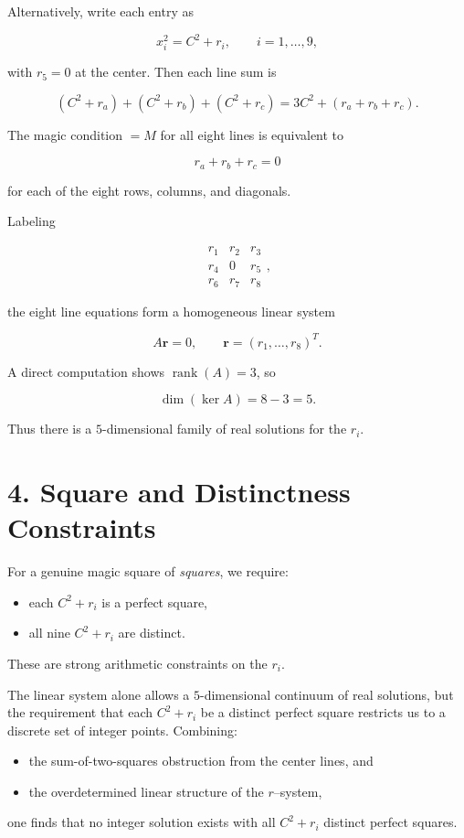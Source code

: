\documentclass[12pt]{article}
\begin{document}
Alternatively, write each entry as


\[
x_i^2 = C^2 + r_i,\qquad i=1,\dots,9,
\]


with $r_5 = 0$ at the center.  Then each line sum is


\[
(C^2+r_a)+(C^2+r_b)+(C^2+r_c)
= 3C^2 + (r_a+r_b+r_c).
\]


The magic condition $=M$ for all eight lines is equivalent to


\[
r_a + r_b + r_c = 0
\]


for each of the eight rows, columns, and diagonals.

Labeling


\[
\begin{matrix}
r_1 & r_2 & r_3 \\
r_4 & 0   & r_5 \\
r_6 & r_7 & r_8
\end{matrix},
\]


the eight line equations form a homogeneous linear system


\[
A\mathbf{r} = 0,\qquad \mathbf{r}=(r_1,\dots,r_8)^T.
\]


A direct computation shows $\operatorname{rank}(A)=3$, so


\[
\dim(\ker A)=8-3=5.
\]


Thus there is a $5$-dimensional family of real solutions for the $r_i$.

\section*{4. Square and Distinctness Constraints}

For a genuine magic square of \emph{squares}, we require:
\begin{itemize}
    \item each $C^2 + r_i$ is a perfect square,
    \item all nine $C^2 + r_i$ are distinct.
\end{itemize}
These are strong arithmetic constraints on the $r_i$.

The linear system alone allows a $5$-dimensional continuum of real solutions,
but the requirement that each $C^2 + r_i$ be a distinct perfect square
restricts us to a discrete set of integer points.  Combining:
\begin{itemize}
    \item the sum-of-two-squares obstruction from the center lines, and
    \item the overdetermined linear structure of the $r$--system,
\end{itemize}
one finds that no integer solution exists with all $C^2+r_i$ distinct
perfect squares.
\end{document}

